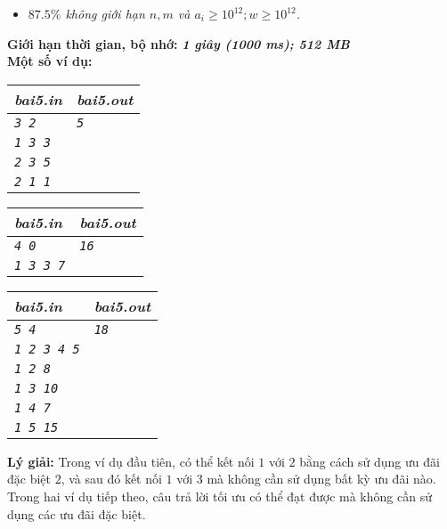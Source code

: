 \begin{ex}
\begin{itemize}
		\item \textit{$87.5\%$ không giới hạn $n,m$ và $a_i \geq 10^{12}; w \geq 10^{12}$. }
	\end{itemize}
		\textbf{Giới hạn thời gian, bộ nhớ: } \textbf{\textit{1 giây (1000 ms); 512 MB}} \\
	\textbf{Một số ví dụ: }
	\begin{center}
		\begin{multicols}{3}
			\begin{tabular}{|l|l|}
				\hline
				\textbf{\textsf{\textit{bai5.in}}} & \textbf{\textsf{\textit{bai5.out}}} \\ %
				\hline
				\textit{\texttt{3 2}} & \textit{\texttt{5}} \\ %
				\textit{\texttt{1 3 3}} & \\
				\textit{\texttt{2 3 5}} & \\
				\textit{\texttt{2 1 1}} & \\
				\hline
			\end{tabular}
			
			\vfil\null \columnbreak
			\begin{tabular}{|l|l|}
				\hline
				\textbf{\textsf{\textit{bai5.in}}} & \textbf{\textsf{\textit{bai5.out}}} \\ %
				\hline
				\textit{\texttt{4 0}} & \textit{\texttt{16}} \\ %
				\textit{\texttt{1 3 3 7}} & \\
				\hline
			\end{tabular}
			\vfil\null \columnbreak
			\begin{tabular}{|l|l|}
				\hline
				\textbf{\textsf{\textit{bai5.in}}} & \textbf{\textsf{\textit{bai5.out}}} \\ %
				\hline
				\textit{\texttt{5 4}} & \textit{\texttt{18}} \\ %
				\textit{\texttt{1 2 3 4 5}} & \\
				\textit{\texttt{1 2 8}} & \\
				\textit{\texttt{1 3 10}} & \\
				\textit{\texttt{1 4 7}} & \\
				\textit{\texttt{1 5 15}} & \\
				\hline
			\end{tabular}
		\end{multicols}
	\end{center}
	
	\textbf{Lý giải: } Trong ví dụ đầu tiên, có thể kết nối $1$ với $2$ bằng cách sử dụng ưu đãi đặc biệt $2$, và sau đó kết nối $1$ với $3$ mà không cần sử dụng bất kỳ ưu đãi nào. \\
	Trong hai ví dụ tiếp theo, câu trả lời tối ưu có thể đạt được mà không cần sử dụng các ưu đãi đặc biệt. 
	
	
\end{ex}


